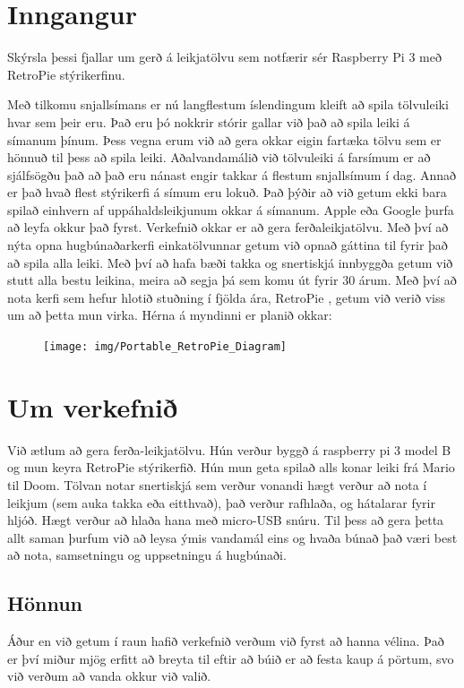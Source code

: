 \section{Inngangur}
Skýrsla þessi fjallar um gerð á leikjatölvu sem notfærir sér Raspberry Pi 3 með RetroPie stýrikerfinu.

Með tilkomu snjallsímans er nú langflestum íslendingum kleift að spila tölvuleiki hvar sem þeir eru. Það eru þó nokkrir stórir gallar við það að spila leiki á símanum þínum. Þess vegna erum við að gera okkar eigin fartæka tölvu sem er hönnuð til þess að spila leiki. Aðalvandamálið við tölvuleiki á farsímum er að sjálfsögðu það að það eru nánast engir takkar á flestum snjallsímum í dag. Annað er það hvað flest stýrikerfi á símum eru lokuð. Það þýðir að við getum ekki bara spilað einhvern af uppáhaldsleikjunum okkar á símanum. Apple eða Google þurfa að leyfa okkur það fyrst. Verkefnið okkar er að gera ferðaleikjatölvu. Með því að nýta opna hugbúnaðarkerfi einkatölvunnar getum við opnað gáttina til fyrir það að spila alla leiki. Með því að hafa bæði takka og snertiskjá innbyggða getum við stutt alla bestu leikina, meira að segja þá sem komu út fyrir 30 árum. Með því að nota kerfi sem hefur hlotið stuðning í fjölda ára, RetroPie \cite{mckittrick2015retropie}, getum við verið viss um að þetta mun virka. Hérna á myndinni er planið okkar:

\begin{figure}[h]
\texttt{[image: img/Portable\_RetroPie\_Diagram]}
\end{figure}
\section{Um verkefnið}
Við ætlum að gera ferða-leikjatölvu. Hún verður byggð á raspberry pi 3 model B og mun keyra RetroPie stýrikerfið. Hún mun geta spilað alls konar leiki frá Mario til Doom. Tölvan notar snertiskjá sem verður vonandi hægt verður að nota í leikjum (sem auka takka eða eitthvað), það verður rafhlaða, og hátalarar fyrir hljóð. Hægt verður að hlaða hana með micro-USB snúru. Til þess að gera þetta allt saman þurfum við að leysa ýmis vandamál eins og hvaða búnað það væri best að nota, samsetningu og uppsetningu á hugbúnaði. 

\subsection{Hönnun}

Áður en við getum í raun hafið verkefnið verðum við fyrst að hanna vélina. Það er því miður mjög erfitt að breyta til eftir að búið er að festa kaup á pörtum, svo við verðum að vanda okkur við valið.

